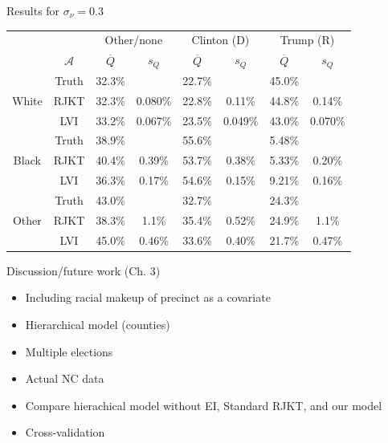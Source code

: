 \documentclass[
  ignorenonframetext,
]{beamer}
\providecommand{\tightlist}{%
  \setlength{\itemsep}{0pt}\setlength{\parskip}{0pt}}
\begin{document}
\begin{frame}{Results for \(\sigma_\nu=0.3\)}
\protect\hypertarget{results-for-sigma_nu0.3}{}

\begin{table}[htbp]
 \label{results0.3}
 \begin{tabular}{cc|cc|cc|cc}
       \multicolumn{2}{c}{}   & \multicolumn{2}{c}{Other/none} & \multicolumn{2}{c}{Clinton (D)} & \multicolumn{2}{c}{Trump (R)} \\
                   &$\mathcal{A}$       &  $\overline{Q}$         &   $s_Q$       &  $\overline{Q}$         &   $s_Q$     &  $\overline{Q}$         &   $s_Q$          \\
 \hline
\multirow{3}{*}{White} & Truth & 32.3\% &  & 22.7\% &  & 45.0\% &  \\ 
                       & RJKT & 32.3\% & 0.080\% & 22.8\% & 0.11\% & 44.8\% & 0.14\% \\ 
                       & LVI & 33.2\% & 0.067\% & 23.5\% & 0.049\% & 43.0\% & 0.070\% \\ 
   \hline
  \multirow{3}{*}{Black} & Truth & 38.9\% &  & 55.6\% &  & 5.48\% &  \\ 
   & RJKT & 40.4\% & 0.39\% & 53.7\% & 0.38\% & 5.33\% & 0.20\% \\ 
   & LVI & 36.3\% & 0.17\% & 54.6\% & 0.15\% & 9.21\% & 0.16\% \\ 
   \hline
  \multirow{3}{*}{Other} & Truth & 43.0\% &  & 32.7\% &  & 24.3\% &  \\ 
   & RJKT & 38.3\% & 1.1\% & 35.4\% & 0.52\% & 24.9\% & 1.1\% \\ 
   & LVI & 45.0\% & 0.46\% & 33.6\% & 0.40\% & 21.7\% & 0.47\% \\ 
   \hline
 \end{tabular}
 \end{table}

\end{frame}

\begin{frame}{Discussion/future work (Ch. 3)}
\protect\hypertarget{discussionfuture-work-ch.-3}{}

\begin{itemize}
\tightlist
\item
  Including racial makeup of precinct as a covariate
\item
  Hierarchical model (counties)
\item
  Multiple elections
\item
  Actual NC data
\item
  Compare hierachical model without EI, Standard RJKT, and our model
\item
  Cross-validation
\end{itemize}

\end{frame}
\end{document}
